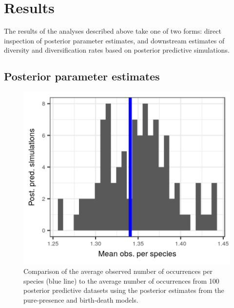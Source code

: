 \documentclass[12pt,letterpaper]{article}
\begin{document}
\section*{Results}

The results of the analyses described above take one of two forms: direct inspection of posterior parameter estimates, and downstream estimates of diversity and diversification rates based on posterior predictive simulations.

\subsection*{Posterior parameter estimates}



\begin{figure}[ht]
  \includegraphics[width=\textwidth,height=0.3\textheight,keepaspectratio=true]{figure/pred_occ_bd}
  \caption[Posterior predictive check of average occurrence]{Comparison of the average observed number of occurrences per species (blue line) to the average number of occurrences from 100 posterior predictive datasets using the posterior estimates from the pure-presence and birth-death models.}
  \label{fig:ppc}
\end{figure}
\end{document}
